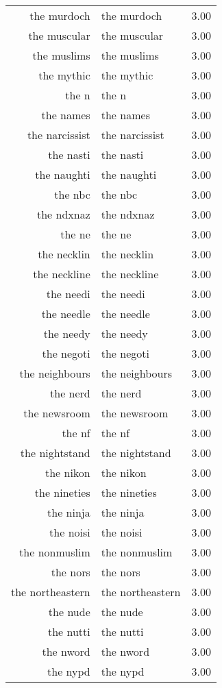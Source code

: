 \begin{table}[ht]
\begin{tabular}{rlr}
  the murdoch & the murdoch & 3.00 \\ 
  the muscular & the muscular & 3.00 \\ 
  the muslims & the muslims & 3.00 \\ 
  the mythic & the mythic & 3.00 \\ 
  the n & the n & 3.00 \\ 
  the names & the names & 3.00 \\ 
  the narcissist & the narcissist & 3.00 \\ 
  the nasti & the nasti & 3.00 \\ 
  the naughti & the naughti & 3.00 \\ 
  the nbc & the nbc & 3.00 \\ 
  the ndxnaz & the ndxnaz & 3.00 \\ 
  the ne & the ne & 3.00 \\ 
  the necklin & the necklin & 3.00 \\ 
  the neckline & the neckline & 3.00 \\ 
  the needi & the needi & 3.00 \\ 
  the needle & the needle & 3.00 \\ 
  the needy & the needy & 3.00 \\ 
  the negoti & the negoti & 3.00 \\ 
  the neighbours & the neighbours & 3.00 \\ 
  the nerd & the nerd & 3.00 \\ 
  the newsroom & the newsroom & 3.00 \\ 
  the nf & the nf & 3.00 \\ 
  the nightstand & the nightstand & 3.00 \\ 
  the nikon & the nikon & 3.00 \\ 
  the nineties & the nineties & 3.00 \\ 
  the ninja & the ninja & 3.00 \\ 
  the noisi & the noisi & 3.00 \\ 
  the nonmuslim & the nonmuslim & 3.00 \\ 
  the nors & the nors & 3.00 \\ 
  the northeastern & the northeastern & 3.00 \\ 
  the nude & the nude & 3.00 \\ 
  the nutti & the nutti & 3.00 \\ 
  the nword & the nword & 3.00 \\ 
  the nypd & the nypd & 3.00 \\ 

\end{tabular}
\end{table}
